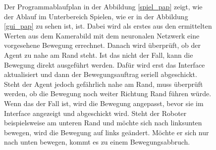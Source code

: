 \begin{figure} [h]
\begin{minipage}[t]{0.5\textwidth}
\vspace{0pt}

Der Programmablaufplan in der Abbildung \ref{spiel_pap} zeigt, wie der Ablauf im Unterbereich Spielen, wie er in der Abbildung \ref{gui_pap} zu sehen ist, ist. Dabei wird als erstes aus den ermittelten Werten aus dem Kamerabild mit dem neuronalen Netzwerk eine vorgesehene Bewegung errechnet. Danach wird überprüft, ob der Agent zu nahe am Rand steht. Ist das nicht der Fall, kann die Bewegung direkt ausgeführt werden. Dafür wird erst das Interface aktualisiert und dann der Bewegungsauftrag seriell abgeschickt. Steht der Agent jedoch gefährlich nahe am Rand, muss überprüft werden, ob die Bewegung noch weiter Richtung Rand führen würde. Wenn das der Fall ist, wird die Bewegung angepasst, bevor sie im Interface angezeigt und abgeschickt wird. Steht der Roboter beispielsweise am unteren Rand und möchte sich nach linksunten bewegen, wird die Bewegung auf links geändert. Möchte er sich nur nach unten bewegen, kommt es zu einem Bewegungsabbruch.
\end{minipage}
\hspace{0.1\textwidth}
\begin{minipage}[t]{0.3\textwidth}
\vspace{0pt}

\end{minipage}
\end{figure}
